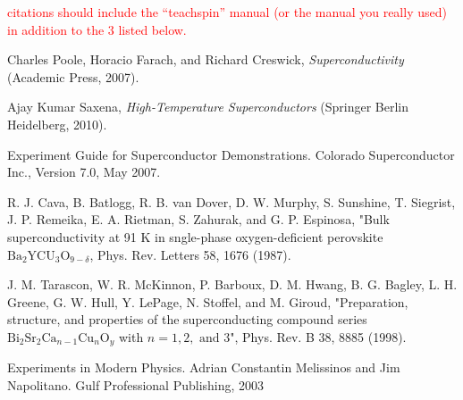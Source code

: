 \documentclass[prb,preprint]{revtex4-1}
\begin{document}
\textcolor{red}{citations should include the ``teachspin'' manual (or the manual you really used) in addition to the 3 listed below. }


\begin{thebibliography}{99}

 Charles Poole, Horacio Farach, and Richard Creswick, \textit{Superconductivity} (Academic Press, 2007).

 Ajay Kumar Saxena, \textit{High-Temperature Superconductors} (Springer Berlin Heidelberg, 2010).

 Experiment Guide for Superconductor Demonstrations. Colorado Superconductor Inc., Version 7.0, May 2007.

 R. J. Cava, B. Batlogg, R. B. van Dover, D. W. Murphy, S. Sunshine, T. Siegrist, J. P. Remeika, E. A. Rietman, S. Zahurak, and G. P. Espinosa, "Bulk superconductivity at 91 K in sngle-phase oxygen-deficient perovskite $\text{Ba}_2\text{YCU}_3\text{O}_{9-\delta}$, Phys. Rev. Letters 58, 1676 (1987).

 J. M. Tarascon, W. R. McKinnon, P. Barboux, D. M. Hwang, B. G. Bagley, L. H. Greene, G. W. Hull, Y. LePage, N. Stoffel, and M. Giroud, "Preparation, structure, and properties of the superconducting compound series $\text{Bi}_2\text{Sr}_2\text{Ca}_{n-1}\text{Cu}_{n}\text{O}_y$ with $n=1,2,\text{ and }3$", Phys. Rev. B 38, 8885 (1998).

 Experiments in Modern Physics.  Adrian Constantin Melissinos and Jim Napolitano.  Gulf Professional Publishing, 2003



\end{thebibliography}


\end{document}

